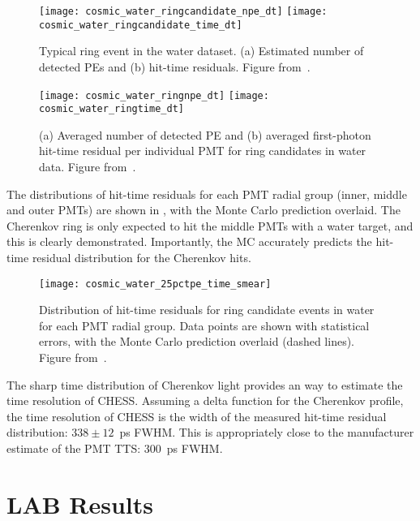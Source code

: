 \begin{figure}
	\centering
	\texttt{[image: cosmic\_water\_ringcandidate\_npe\_dt]}
	\texttt{[image: cosmic\_water\_ringcandidate\_time\_dt]}
	\caption{Typical ring event in the water dataset. (a) Estimated number of detected PEs and (b) hit-time residuals. Figure from~\cite{chess_nim}.}
	\label{fig:cosmics_water_ring_candidate}
\end{figure}


\begin{figure}
	\centering
	\texttt{[image: cosmic\_water\_ringnpe\_dt]}
	\texttt{[image: cosmic\_water\_ringtime\_dt]}
	\caption{(a) Averaged number of detected PE and (b) averaged first-photon hit-time residual per individual PMT for ring candidates in water data. Figure from~\cite{chess_nim}.}
	\label{fig:cosmics_water_npes}
\end{figure}


The distributions of hit-time residuals for each PMT radial group (inner, middle and outer PMTs) are shown in , with the Monte Carlo prediction overlaid. 
The Cherenkov ring is only expected to hit the middle PMTs with a water target, and this is clearly demonstrated.
Importantly, the MC accurately predicts the hit-time residual distribution for the Cherenkov hits. 


\begin{figure}
	\centering
	\texttt{[image: cosmic\_water\_25pctpe\_time\_smear]}
	\caption{Distribution of hit-time residuals for ring candidate events in water for each PMT radial group. Data points are shown with statistical errors, with the Monte Carlo prediction overlaid (dashed lines). Figure from~\cite{chess_nim}.}
	\label{fig:cosmics_water}
\end{figure}


The sharp time distribution of Cherenkov light provides an way to estimate the time resolution of CHESS.
Assuming a delta function for the Cherenkov profile, the time resolution of CHESS is the width of the measured hit-time residual distribution: $338\pm 12$~ps FWHM. 
This is appropriately close to the manufacturer estimate of the PMT TTS: 300~ps FWHM. 

\clearpage

\section{LAB Results}

\label{sec:lab}

